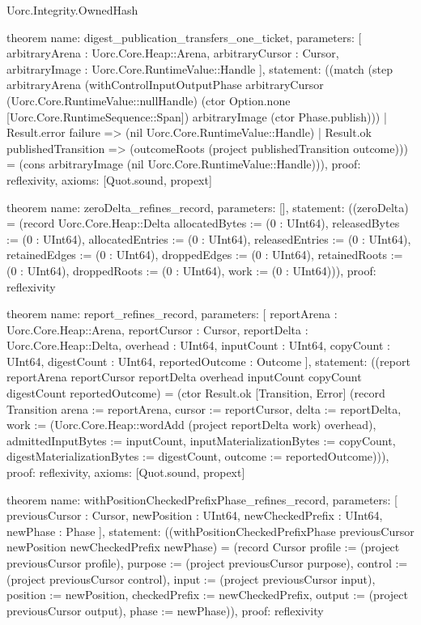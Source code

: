 \begin{lexlean}{Uorc.Integrity.OwnedHash}
\begin{semanticmodule}
theorem{
  name: digest_publication_transfers_one_ticket,
  parameters: [
    arbitraryArena : Uorc.Core.Heap::Arena,
    arbitraryCursor : Cursor,
    arbitraryImage : Uorc.Core.RuntimeValue::Handle
  ],
  statement: ((match (step arbitraryArena (withControlInputOutputPhase arbitraryCursor (Uorc.Core.RuntimeValue::nullHandle) (ctor Option.none [Uorc.Core.RuntimeSequence::Span]) arbitraryImage (ctor Phase.publish)))
    | Result.error failure => (nil Uorc.Core.RuntimeValue::Handle)
    | Result.ok publishedTransition => (outcomeRoots (project publishedTransition outcome))) = (cons arbitraryImage (nil Uorc.Core.RuntimeValue::Handle))),
  proof: reflexivity{},
  axioms: [Quot.sound, propext]
}

theorem{
  name: zeroDelta_refines_record,
  parameters: [],
  statement: ((zeroDelta) = (record Uorc.Core.Heap::Delta {allocatedBytes := (0 : UInt64), releasedBytes := (0 : UInt64), allocatedEntries := (0 : UInt64), releasedEntries := (0 : UInt64), retainedEdges := (0 : UInt64), droppedEdges := (0 : UInt64), retainedRoots := (0 : UInt64), droppedRoots := (0 : UInt64), work := (0 : UInt64)})),
  proof: reflexivity{}
}

theorem{
  name: report_refines_record,
  parameters: [
    reportArena : Uorc.Core.Heap::Arena,
    reportCursor : Cursor,
    reportDelta : Uorc.Core.Heap::Delta,
    overhead : UInt64,
    inputCount : UInt64,
    copyCount : UInt64,
    digestCount : UInt64,
    reportedOutcome : Outcome
  ],
  statement: ((report reportArena reportCursor reportDelta overhead inputCount copyCount digestCount reportedOutcome) = (ctor Result.ok [Transition, Error] (record Transition {arena := reportArena, cursor := reportCursor, delta := reportDelta, work := (Uorc.Core.Heap::wordAdd (project reportDelta work) overhead), admittedInputBytes := inputCount, inputMaterializationBytes := copyCount, digestMaterializationBytes := digestCount, outcome := reportedOutcome}))),
  proof: reflexivity{},
  axioms: [Quot.sound, propext]
}

theorem{
  name: withPositionCheckedPrefixPhase_refines_record,
  parameters: [
    previousCursor : Cursor,
    newPosition : UInt64,
    newCheckedPrefix : UInt64,
    newPhase : Phase
  ],
  statement: ((withPositionCheckedPrefixPhase previousCursor newPosition newCheckedPrefix newPhase) = (record Cursor {profile := (project previousCursor profile), purpose := (project previousCursor purpose), control := (project previousCursor control), input := (project previousCursor input), position := newPosition, checkedPrefix := newCheckedPrefix, output := (project previousCursor output), phase := newPhase})),
  proof: reflexivity{}
}


\end{semanticmodule}
\end{lexlean}

